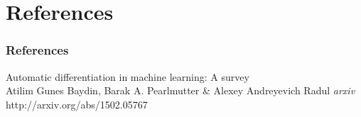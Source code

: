 \section{References}
\begin{frame}
\frametitle{References}
\footnotesize{
	\begin{thebibliography}{99}
		 Automatic differentiation in machine learning: A survey\\
		\newblock Atilim Gunes Baydin, Barak A. Pearlmutter \& Alexey Andreyevich Radul
		\newblock \emph{arxiv} http://arxiv.org/abs/1502.05767
	\end{thebibliography}
}
\end{frame}

